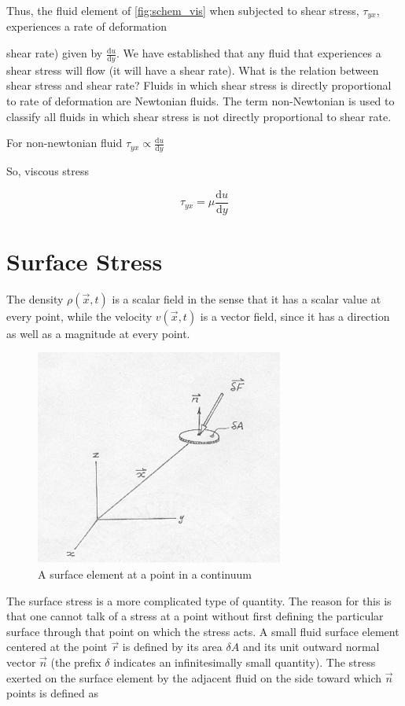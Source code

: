 \documentclass{article}
\begin{document}
Thus, the fluid element of \ref{fig:schem_vis} when subjected to shear stress, $\tau_{yx}$, experiences a rate of deformation {shear rate) given by $\frac{\text{d}u}{\text{d}y}$. We have established that any fluid
that experiences a shear stress will flow (it will have a shear rate). What is the relation between shear stress and shear rate? Fluids in which shear stress is directly
proportional to rate of deformation are Newtonian fluids. The term non-Newtonian
is used to classify all fluids in which shear stress is not directly proportional to
shear rate.

For non-newtonian fluid $\tau_{yx} \propto \frac{\text{d}u}{\text{d}y}$

So, viscous stress 

\begin{equation}
\tau_{yx} = \mu\frac{\text{d}u}{\text{d}y} \label{e1}
\end{equation}

\section*{Surface Stress}

The density $\rho(\overrightarrow{x},t)$ is a scalar field in the sense that it has a scalar value at every point, while the velocity $v(\overrightarrow{x},t)$ is a vector field, since it has a direction as well as a magnitude at every point.

\begin{figure}[h]
\centering
\includegraphics[scale=.8]{surface element in continuum.jpg}
\caption{A surface element at a point in a continuum}
\label{fig:sur_el_in_contnm}
\end{figure}


The surface stress is a more complicated type of quantity. The reason for this is
that one cannot talk of a stress at a point without first defining the particular surface
through that point on which the stress acts. A small fluid surface element centered at the
point $\overrightarrow{r}$ is defined by its area $\delta A$ and its unit outward normal vector $\overrightarrow{n}$ (the prefix $\delta$ indicates an infinitesimally small quantity). The stress exerted on the surface element by the adjacent fluid on the side toward which $\overrightarrow{n}$ points is defined as

}
\end{document}
